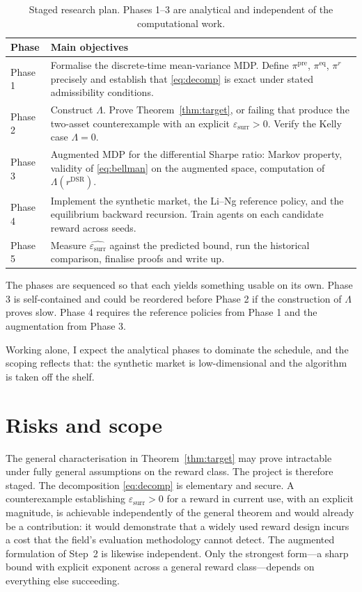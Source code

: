 \documentclass[11pt,a4paper]{article}
\theoremstyle{plain}
\theoremstyle{definition}
\newcommand{\pipre}{\pi^{\mathrm{pre}}}
\newcommand{\pieq}{\pi^{\mathrm{eq}}}
\newcommand{\pir}{\pi^{r}}
\newcommand{\epssurr}{\varepsilon_{\mathrm{surr}}}
\begin{document}
\begin{table}[h]
\centering
\small
\begin{tabular}{p{2.6cm}p{11.4cm}}
\toprule
\textbf{Phase} & \textbf{Main objectives}\\
\midrule
Phase 1 & Formalise the discrete-time mean-variance MDP. Define $\pipre$, $\pieq$,
$\pir$ precisely and establish that \eqref{eq:decomp} is exact under stated
admissibility conditions.\\[0.35em]
Phase 2 & Construct $\Lambda$. Prove Theorem~\ref{thm:target}, or failing that produce
the two-asset counterexample with an explicit $\epssurr>0$. Verify the Kelly case
$\Lambda=0$.\\[0.35em]
Phase 3 & Augmented MDP for the differential Sharpe ratio: Markov property, validity of
\eqref{eq:bellman} on the augmented space, computation of
$\Lambda(r^{\mathrm{DSR}})$.\\[0.35em]
Phase 4 & Implement the synthetic market, the Li--Ng reference policy, and the
equilibrium backward recursion. Train agents on each candidate reward across seeds.\\[0.35em]
Phase 5 & Measure $\widehat{\epssurr}$ against the predicted bound, run the historical
comparison, finalise proofs and write up.\\
\bottomrule
\end{tabular}
\caption{Staged research plan. Phases 1--3 are analytical and independent of the
computational work.}
\end{table}

\noindent
The phases are sequenced so that each yields something usable on its own. Phase 3 is
self-contained and could be reordered before Phase 2 if the construction of $\Lambda$
proves slow. Phase 4 requires the reference policies from Phase 1 and the augmentation
from Phase 3.

Working alone, I expect the analytical phases to dominate the schedule, and the scoping
reflects that: the synthetic market is low-dimensional and the algorithm is taken off
the shelf.

\section{Risks and scope}
\label{sec:risks}

The general characterisation in Theorem~\ref{thm:target} may prove intractable under
fully general assumptions on the reward class. The project is therefore staged. The
decomposition \eqref{eq:decomp} is elementary and secure. A counterexample establishing
$\epssurr>0$ for a reward in current use, with an explicit magnitude, is achievable
independently of the general theorem and would already be a contribution: it would
demonstrate that a widely used reward design incurs a cost that the field's evaluation
methodology cannot detect. The augmented formulation of Step~2 is likewise
independent. Only the strongest form---a sharp bound with explicit exponent across a
general reward class---depends on everything else succeeding.
\end{document}
